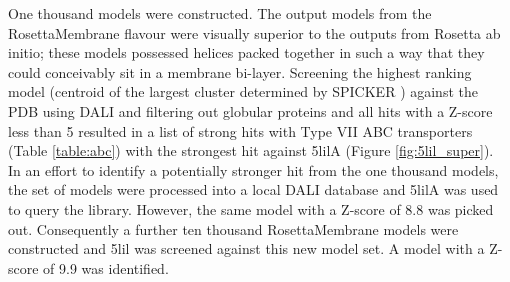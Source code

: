 One thousand models were constructed. The output models from the RosettaMembrane flavour were visually superior to the outputs from Rosetta ab initio;  these models possessed helices packed together in such a way that they could conceivably sit in a membrane bi-layer.  Screening the highest ranking model (centroid of the largest cluster determined by SPICKER \cite{Zhang2004}) against the PDB using DALI and filtering out globular proteins and all hits with a Z-score less than 5 resulted in a list of strong hits with Type VII ABC transporters (Table \ref{table:abc}) with the strongest hit against 5lilA (Figure \ref{fig:5lil_super}). \\

In an effort to identify a potentially stronger hit from the one thousand models, the set of models were processed into a local DALI database and 5lilA was used to query the library.  However, the same model with a Z-score of 8.8 was picked out.  Consequently a further ten thousand RosettaMembrane models were constructed and 5lil was screened against this new model set.  A model with a Z-score of 9.9 was identified.

